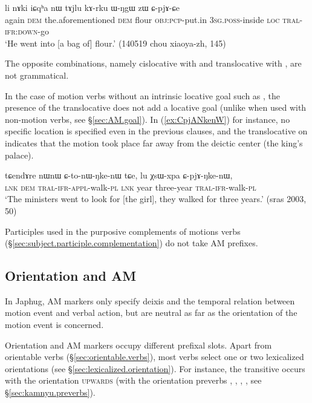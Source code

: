 \begin{exe}
\ex \label{ex:CpjACe}
 \gll li nɤki iɕqʰa nɯ tɤjlu kɤ-rku ɯ-ŋgɯ zɯ ɕ-pjɤ-ɕe \\
 again \textsc{dem} the.aforementioned \textsc{dem} flour \textsc{obj}:\textsc{pcp}-put.in \textsc{3sg}.\textsc{poss}-inside \textsc{loc} \textsc{tral}-\textsc{ifr}:\textsc{down}-go \\
 \glt `He went into [a bag of] flour.' (140519 chou xiaoya-zh, 145)
\end{exe}

The opposite combinations, namely cislocative with  and translocative with , are not grammatical. 

In the case of motion verbs without an intrinsic locative goal such as , the presence of the translocative does not add a locative goal (unlike when used with non-motion verbs, see §\ref{sec:AM.goal}). In (\ref{ex:CpjANkenW}) for instance, no specific location is specified even in the previous clauses, and the translocative on   indicates that the motion took place far away from the deictic center (the king's palace).

\begin{exe}
\ex \label{ex:CpjANkenW}
 \gll tɕendɤre nɯnɯ ɕ-to-nɯ-ŋke-nɯ tɕe, lu χsɯ-xpa ɕ-pjɤ-ŋke-nɯ, \\
 \textsc{lnk} \textsc{dem} \textsc{tral}-\textsc{ifr}-\textsc{appl}-walk-\textsc{pl} \textsc{lnk} year three-year \textsc{tral}-\textsc{ifr}-walk-\textsc{pl} \\
\glt `The ministers went to look for [the girl], they walked for three years.' (sras 2003, 50)
\end{exe}

Participles used in the purposive complements of motions verbs (§\ref{sec:subject.participle.complementation}) do not take AM prefixes.

\subsection{Orientation and AM} \label{sec:orientation.AM}
In Japhug, AM markers only specify deixis and the temporal relation between motion event and verbal action, but are neutral as far as the orientation of the motion event is concerned.

Orientation and AM markers occupy different prefixal slots. Apart from orientable verbs (§\ref{sec:orientable.verbs}), most verbs select one or two lexicalized orientations (see §\ref{sec:lexicalized.orientation}). For instance, the transitive  occurs with the orientation \textsc{upwards} (with the orientation preverbs , , , , see §\ref{sec:kamnyu.preverbs}). 

